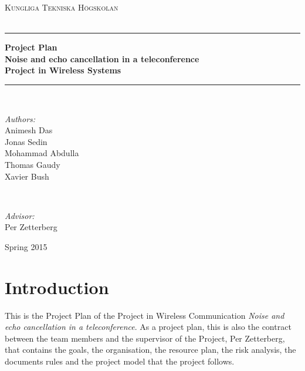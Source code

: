 \documentclass[11pt]{article}
\newcommand{\HRule}{\rule{\linewidth}{0.5mm}}
\begin{document}
\begin{titlepage}
\begin{center}


\textsc{\LARGE Kungliga Tekniska Högskolan}\\[1.5cm]

\textsc{\Large ~}\\[-0.5cm]


\HRule
{ \huge \bfseries \textbf{Project Plan} \\ Noise and echo cancellation in a teleconference \\ Project in Wireless Systems \\[0.4cm] }

\HRule \\[1.1cm]

\begin{minipage}{0.4\textwidth}
\begin{flushleft}
\emph{Authors:}\\
Animesh Das \\ Jonas Sedin \\ Mohammad Abdulla \\ Thomas Gaudy \\ Xavier Bush
\end{flushleft}
\end{minipage}
~
\begin{minipage}{0.4\textwidth}
\begin{flushright}
\emph{Advisor:}\\
Per Zetterberg
\end{flushright}
\end{minipage}

\vfill

{\large Spring 2015} \\[1cm]
\end{center}



\end{titlepage}
\restoregeometry   



\pagebreak\tableofcontents
\pagebreak
\section{Introduction}

This is the Project Plan of the Project in Wireless Communication \textit{ Noise and echo cancellation in a teleconference}. As a project plan, this is also the contract between the team members and the supervisor of the Project, Per Zetterberg, that contains the goals, the organisation, the resource plan, the risk analysis, the documents rules and the project model that the project follows.
\end{document}
